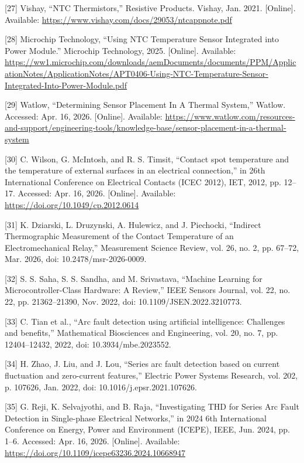 \begin{thesisreferences}
{[}27{]} Vishay, ``NTC Thermistors,'' Resistive Products. Vishay, Jan.
2021. {[}Online{]}. Available:
\url{https://www.vishay.com/docs/29053/ntcappnote.pdf}

{[}28{]} Microchip Technology, ``Using NTC Temperature Sensor Integrated
into Power Module.'' Microchip Technology, 2025. {[}Online{]}.
Available:
\url{https://ww1.microchip.com/downloads/aemDocuments/documents/PPM/ApplicationNotes/ApplicationNotes/APT0406-Using-NTC-Temperature-Sensor-Integrated-Into-Power-Module.pdf}

{[}29{]} Watlow, ``Determining Sensor Placement In A Thermal System,''
Watlow. Accessed: Apr. 16, 2026. {[}Online{]}. Available:
\url{https://www.watlow.com/resources-and-support/engineering-tools/knowledge-base/sensor-placement-in-a-thermal-system}

{[}30{]} C. Wilson, G. McIntosh, and R. S. Timsit, ``Contact spot
temperature and the temperature of external surfaces in an electrical
connection,'' in 26th International Conference on Electrical Contacts
(ICEC 2012), IET, 2012, pp. 12--17. Accessed: Apr. 16, 2026.
{[}Online{]}. Available:
\url{https://doi.org/10.1049/cp.2012.0614}

{[}31{]} K. Dziarski, L. Druzynski, A. Hulewicz, and J. Piechocki,
``Indirect Thermographic Measurement of the Contact Temperature of an
Electromechanical Relay,'' Measurement Science Review, vol. 26, no. 2,
pp. 67--72, Mar. 2026, doi: 10.2478/msr-2026-0009.

{[}32{]} S. S. Saha, S. S. Sandha, and M. Srivastava, ``Machine Learning
for Microcontroller-Class Hardware: A Review,'' IEEE Sensors Journal,
vol. 22, no. 22, pp. 21362--21390, Nov. 2022, doi:
10.1109/JSEN.2022.3210773.

{[}33{]} C. Tian et al., ``Arc fault detection using artificial
intelligence: Challenges and benefits,'' Mathematical Biosciences and
Engineering, vol. 20, no. 7, pp. 12404--12432, 2022, doi:
10.3934/mbe.2023552.

{[}34{]} H. Zhao, J. Liu, and J. Lou, ``Series arc fault detection based
on current fluctuation and zero-current features,'' Electric Power
Systems Research, vol. 202, p. 107626, Jan. 2022, doi:
10.1016/j.epsr.2021.107626.

{[}35{]} G. Reji, K. Selvajyothi, and B. Raja, ``Investigating THD for
Series Arc Fault Detection in Single-phase Electrical Networks,'' in
2024 6th International Conference on Energy, Power and Environment
(ICEPE), IEEE, Jun. 2024, pp. 1--6. Accessed: Apr. 16, 2026.
{[}Online{]}. Available:
\url{https://doi.org/10.1109/icepe63236.2024.10668947}


\end{thesisreferences}
